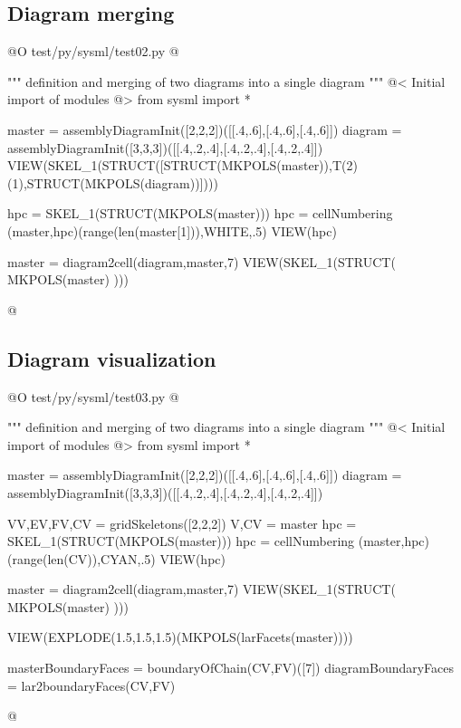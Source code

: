 \documentclass[11pt,oneside]{article}	%
\begin{document}
\subsection{Diagram merging}

@O test/py/sysml/test02.py
@{""" definition and merging of two diagrams into a single diagram """
@< Initial import of modules @>
from sysml import *

master = assemblyDiagramInit([2,2,2])([[.4,.6],[.4,.6],[.4,.6]])
diagram = assemblyDiagramInit([3,3,3])([[.4,.2,.4],[.4,.2,.4],[.4,.2,.4]])
VIEW(SKEL_1(STRUCT([STRUCT(MKPOLS(master)),T(2)(1),STRUCT(MKPOLS(diagram))])))

hpc = SKEL_1(STRUCT(MKPOLS(master)))
hpc = cellNumbering (master,hpc)(range(len(master[1])),WHITE,.5)
VIEW(hpc)

master = diagram2cell(diagram,master,7)
VIEW(SKEL_1(STRUCT( MKPOLS(master) )))

@}

\subsection{Diagram visualization}


@O test/py/sysml/test03.py
@{""" definition and merging of two diagrams into a single diagram """
@< Initial import of modules @>
from sysml import *

master = assemblyDiagramInit([2,2,2])([[.4,.6],[.4,.6],[.4,.6]])
diagram = assemblyDiagramInit([3,3,3])([[.4,.2,.4],[.4,.2,.4],[.4,.2,.4]])

VV,EV,FV,CV = gridSkeletons([2,2,2])
V,CV = master
hpc = SKEL_1(STRUCT(MKPOLS(master)))
hpc = cellNumbering (master,hpc)(range(len(CV)),CYAN,.5)
VIEW(hpc)

master = diagram2cell(diagram,master,7)
VIEW(SKEL_1(STRUCT( MKPOLS(master) )))

VIEW(EXPLODE(1.5,1.5,1.5)(MKPOLS(larFacets(master))))

masterBoundaryFaces = boundaryOfChain(CV,FV)([7])
diagramBoundaryFaces = lar2boundaryFaces(CV,FV)


@}
\end{document}

